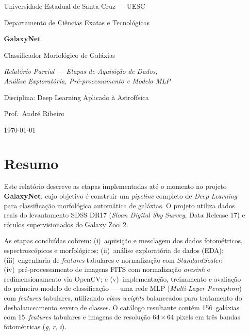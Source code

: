 \documentclass[12pt, a4paper]{article}
\begin{document}
\begin{titlepage}
  \centering
  \vspace*{2cm}
  {\Large Universidade Estadual de Santa Cruz --- UESC \par}
  \vspace{0.4cm}
  {\large Departamento de Ciências Exatas e Tecnológicas \par}
  \vspace{3cm}
  {\Huge\bfseries GalaxyNet \par}
  \vspace{0.5cm}
  {\LARGE Classificador Morfológico de Galáxias \par}
  \vspace{0.8cm}
  {\large\itshape Relatório Parcial --- Etapas de Aquisição de Dados,\\
   Análise Exploratória, Pré-processamento e Modelo MLP \par}
  \vfill
  {\large Disciplina: Deep Learning Aplicado à Astrofísica \par}
  \vspace{0.3cm}
  {\large Prof.\ André Ribeiro \par}
  \vspace{1cm}
  {\large \today \par}
\end{titlepage}

\tableofcontents
\newpage

\section{Resumo}

Este relatório descreve as etapas implementadas até o momento no projeto
\textbf{GalaxyNet}, cujo objetivo é construir um \textit{pipeline} completo de
\textit{Deep Learning} para classificação morfológica automática de galáxias.
O projeto utiliza dados reais do levantamento SDSS DR17 (\textit{Sloan Digital
Sky Survey}, Data Release 17) e rótulos supervisionados do Galaxy Zoo~2.

As etapas concluídas cobrem: (i)~aquisição e mesclagem dos dados fotométricos,
espectroscópicos e morfológicos; (ii)~análise exploratória de dados (EDA);
(iii)~engenharia de \textit{features} tabulares e normalização com
\textit{StandardScaler}; (iv)~pré-processamento de imagens FITS com
normalização \textit{arcsinh} e redimensionamento via OpenCV; e
(v)~implementação, treinamento e avaliação do primeiro modelo de classificação
--- uma rede MLP (\textit{Multi-Layer Perceptron}) com \textit{features}
tabulares, utilizando \textit{class weights} balanceados para tratamento do
desbalanceamento severo de classes.
O catálogo resultante contém 156~galáxias com 15~\textit{features} tabulares
e imagens de resolução $64 \times 64$ pixels em três bandas fotométricas
(\textit{g}, \textit{r}, \textit{i}).
\end{document}
